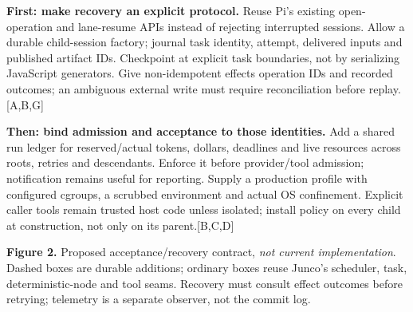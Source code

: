 \documentclass[10pt,a4paper]{article}
\newcommand{\heading}[1]{\par\vspace{5pt}{\large\bfseries\color{ink}#1}\par\vspace{2pt}}
\newcommand{\src}[1]{\textcolor{accent}{\scriptsize[#1]}}
\begin{document}
\newpage
\heading{Close the guarantees before expanding the fleet}
\textbf{First: make recovery an explicit protocol.} Reuse Pi's existing open-operation and lane-resume APIs instead of rejecting interrupted sessions. Allow a durable child-session factory; journal task identity, attempt, delivered inputs and published artifact IDs. Checkpoint at explicit task boundaries, not by serializing JavaScript generators. Give non-idempotent effects operation IDs and recorded outcomes; an ambiguous external write must require reconciliation before replay.\src{A,B,G}

\textbf{Then: bind admission and acceptance to those identities.} Add a shared run ledger for reserved/actual tokens, dollars, deadlines and live resources across roots, retries and descendants. Enforce it before provider/tool admission; notification remains useful for reporting. Supply a production profile with configured cgroups, a scrubbed environment and actual OS confinement. Explicit caller tools remain trusted host code unless isolated; install policy on every child at construction, not only on its parent.\src{B,C,D}

\begin{center}
\end{center}
\vspace{-5pt}
{\small\textbf{Figure 2.} Proposed acceptance/recovery contract, \emph{not current implementation}. Dashed boxes are durable additions; ordinary boxes reuse Junco's scheduler, task, deterministic-node and tool seams. Recovery must consult effect outcomes before retrying; telemetry is a separate observer, not the commit log.}
\end{document}
